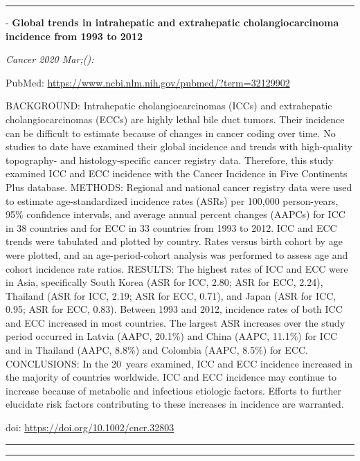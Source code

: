 \documentclass[
]{article}
\begin{document}
\begin{center}\rule{0.5\linewidth}{0.5pt}\end{center}

- \textbf{Global trends in intrahepatic and extrahepatic
cholangiocarcinoma incidence from 1993 to 2012}

\emph{Cancer 2020 Mar;():}

PubMed: \url{https://www.ncbi.nlm.nih.gov/pubmed/?term=32129902}

BACKGROUND: Intrahepatic cholangiocarcinomas (ICCs) and extrahepatic
cholangiocarcinomas (ECCs) are highly lethal bile duct tumors. Their
incidence can be difficult to estimate because of changes in cancer
coding over time. No studies to date have examined their global
incidence and trends with high-quality topography- and
histology-specific cancer registry data. Therefore, this study examined
ICC and ECC incidence with the Cancer Incidence in Five Continents Plus
database. METHODS: Regional and national cancer registry data were used
to estimate age-standardized incidence rates (ASRs) per 100,000
person-years, 95\% confidence intervals, and average annual percent
changes (AAPCs) for ICC in 38 countries and for ECC in 33 countries from
1993 to 2012. ICC and ECC trends were tabulated and plotted by country.
Rates versus birth cohort by age were plotted, and an age-period-cohort
analysis was performed to assess age and cohort incidence rate ratios.
RESULTS: The highest rates of ICC and ECC were in Asia, specifically
South Korea (ASR for ICC, 2.80; ASR for ECC, 2.24), Thailand (ASR for
ICC, 2.19; ASR for ECC, 0.71), and Japan (ASR for ICC, 0.95; ASR for
ECC, 0.83). Between 1993 and 2012, incidence rates of both ICC and ECC
increased in most countries. The largest ASR increases over the study
period occurred in Latvia (AAPC, 20.1\%) and China (AAPC, 11.1\%) for
ICC and in Thailand (AAPC, 8.8\%) and Colombia (AAPC, 8.5\%) for ECC.
CONCLUSIONS: In the 20~years examined, ICC and ECC incidence increased
in the majority of countries worldwide. ICC and ECC incidence may
continue to increase because of metabolic and infectious etiologic
factors. Efforts to further elucidate risk factors contributing to these
increases in incidence are warranted.

doi: \url{https://doi.org/10.1002/cncr.32803}

\begin{center}\rule{0.5\linewidth}{0.5pt}\end{center}

\begin{center}\rule{0.5\linewidth}{0.5pt}\end{center}
\end{document}
